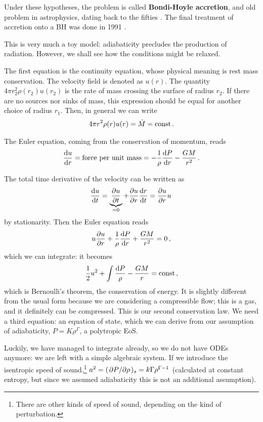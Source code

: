 \documentclass[main.tex]{subfiles}
\begin{document}
Under these hypotheses, the problem is called \textbf{Bondi-Hoyle accretion}, and old problem in astrophysics, dating back to the fifties \cite[]{bondiSphericallySymmetricalAccretion1952}. 
The final treatment of accretion onto a BH was done in 1991 \cite[]{nobiliSphericalAccretionBlack1991}. 

This is very much a toy model: adiabaticity precludes the production of radiation. However, we shall see how the conditions might be relaxed. 

The first equation is the continuity equation, whose physical meaning is rest mass conservation. 
The velocity field is denoted as \(u(r)\). 
The quantity \(4\pi r_2^2 \rho (r_2) u(r_2 )\) is the rate of mass crossing the surface of radius \(r_2 \). 
If there are no sources nor sinks of mass, this expression should be equal for another choice of radius \(r_1 \). 
Then, in general we can write 
%
\begin{align}
4 \pi r^2 \rho (r) u(r ) = \dot{M} = \text{const}
\,.
\end{align}

The Euler equation, coming from the conservation of momentum, reads
%
\begin{align}
\dv{u}{r} = \text{force per unit mass} = - \frac{1}{\rho } \dv{P}{r} - \frac{GM}{r^2}
\,.
\end{align}

The total time derivative of the velocity can be written as 
%
\begin{align}
\dv{u}{t} = \underbrace{\pdv{u}{t}}_{= 0} + \pdv{u}{r} \dv{r}{t}
= \pdv{u}{r} u 
\,
\end{align}
%
by stationarity. Then the Euler equation reads 
%
\begin{align}
u \pdv{u}{r} + \frac{1}{\rho } \dv{P}{r} + \frac{GM}{r^2} = 0
\,,
\end{align}
%
which we can integrate: it becomes 
%
\begin{align}
\frac{1}{2} u^2 + \int \frac{\dd{P}}{\rho } - \frac{GM}{r} = \text{const}
\,,
\end{align}
%
which is Bernoulli's theorem, the conservation of energy. It is slightly different from the usual form because we are considering a compressible flow; this is a gas, and it definitely can be compressed.  
This is our second conservation law. 
We need a third equation: an equation of state, which we can derive from our assumption of adiabaticity, \(P = K \rho^{\Gamma }\), a polytropic EoS. 

Luckily, we have managed to integrate already, so we do not have ODEs anymore: we are left with a simple algebraic system. 
If we introduce the isentropic speed of sound,\footnote{There are other kinds of speed of sound, depending on the kind of perturbation.} \(a^2 = (\pdv*{P}{\rho })_s = k \Gamma \rho^{\Gamma -1}\) (calculated at constant entropy, but since we assumed adiabaticity this is not an additional assumption).
\end{document}
